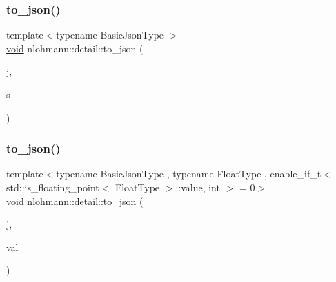 \subsubsection{\texorpdfstring{to\_json()}{to\_json()}\hspace{0.1cm}{\footnotesize\ttfamily [3/17]}}
{\footnotesize\ttfamily template$<$typename Basic\+Json\+Type $>$ \\
\mbox{\hyperlink{namespacenlohmann_1_1detail_a59fca69799f6b9e366710cb9043aa77d}{void}} nlohmann\+::detail\+::to\+\_\+json (\begin{DoxyParamCaption}\item[{Basic\+Json\+Type \&}]{j,  }\item[{typename Basic\+Json\+Type\+::string\+\_\+t \&\&}]{s }\end{DoxyParamCaption})}

\mbox{\label{namespacenlohmann_1_1detail_a22bffdc8bc7e43af380ba2050696b230}} 
\subsubsection{\texorpdfstring{to\_json()}{to\_json()}\hspace{0.1cm}{\footnotesize\ttfamily [4/17]}}
{\footnotesize\ttfamily template$<$typename Basic\+Json\+Type , typename Float\+Type , enable\+\_\+if\+\_\+t$<$ std\+::is\+\_\+floating\+\_\+point$<$ Float\+Type $>$\+::value, int $>$  = 0$>$ \\
\mbox{\hyperlink{namespacenlohmann_1_1detail_a59fca69799f6b9e366710cb9043aa77d}{void}} nlohmann\+::detail\+::to\+\_\+json (\begin{DoxyParamCaption}\item[{Basic\+Json\+Type \&}]{j,  }\item[{Float\+Type}]{val }\end{DoxyParamCaption})\hspace{0.3cm}{\ttfamily [noexcept]}}

\mbox{\label{namespacenlohmann_1_1detail_ae5fd66b5517b3b5a6c6b9fd9f29ba8dc}} 
